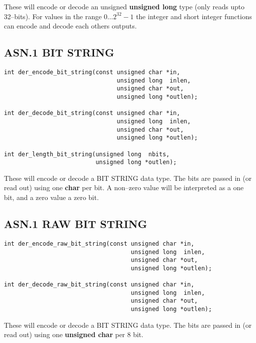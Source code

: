 \documentclass[synpaper]{book}
\begin{document}
These will encode or decode an unsigned \textbf{unsigned long} type (only reads upto 32--bits).  For values in the range $0 \dots 2^{32} - 1$ the integer
and short integer functions can encode and decode each others outputs.

\subsection{ASN.1 BIT STRING}

\begin{verbatim}
int der_encode_bit_string(const unsigned char *in,
                                unsigned long  inlen,
                                unsigned char *out,
                                unsigned long *outlen);

int der_decode_bit_string(const unsigned char *in,
                                unsigned long  inlen,
                                unsigned char *out,
                                unsigned long *outlen);

int der_length_bit_string(unsigned long  nbits,
                          unsigned long *outlen);
\end{verbatim}

These will encode or decode a BIT STRING data type.  The bits are passed in (or read out) using one \textbf{char} per bit.  A non--zero value will be interpreted
as a one bit, and a zero value a zero bit.

\subsection{ASN.1 RAW BIT STRING}

\begin{verbatim}
int der_encode_raw_bit_string(const unsigned char *in,
                                    unsigned long  inlen,
                                    unsigned char *out,
                                    unsigned long *outlen);

int der_decode_raw_bit_string(const unsigned char *in,
                                    unsigned long  inlen,
                                    unsigned char *out,
                                    unsigned long *outlen);
\end{verbatim}

These will encode or decode a BIT STRING data type.
The bits are passed in (or read out) using one \textbf{unsigned char} per 8 bit.
\end{document}
